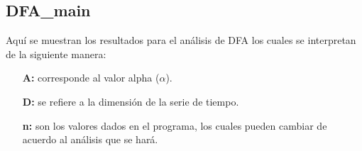 \documentclass[letterpaper,titlepage,12pt,draft]{report}
\begin{document}
%
%
%

\subsection{DFA\_main}

Aqu\'i se muestran los resultados para el an\'alisis de DFA los cuales se interpretan de la siguiente manera:
\begin{itemize}
\item[\bf A:] corresponde al valor alpha ($\alpha$).
\item[\bf D:] se refiere a la dimensi\'on de la serie de tiempo.
\item[\bf n:] son los valores dados en el programa, los cuales pueden cambiar de acuerdo al an\'alisis que se har\'a.
\end{itemize}
\end{document}
